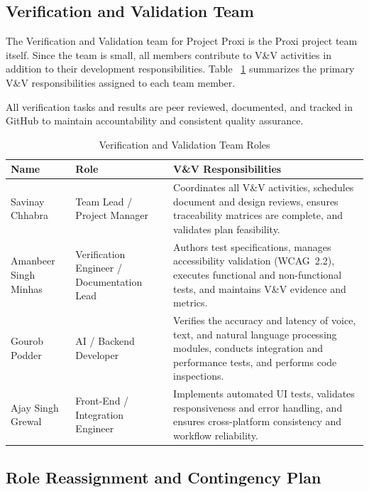 \documentclass[12pt, titlepage]{article}
\begin{document}
\subsection{Verification and Validation Team}

The Verification and Validation team for Project Proxi is the Proxi project
team itself. Since the team is small, all members contribute to V\&V
activities in addition to their development responsibilities. Table~
\ref{tab:vnv-team} summarizes the primary V\&V responsibilities assigned to
each team member.

All verification tasks and results are peer reviewed, documented, and
tracked in GitHub to maintain accountability and consistent quality
assurance.

\begin{table}[H]
\caption{Verification and Validation Team Roles}
\label{tab:vnv-team}
\centering
\begin{tabular}{|p{3cm}|p{3.5cm}|p{7.5cm}|}
\hline
\textbf{Name} & \textbf{Role} & \textbf{V\&V Responsibilities} \\
\hline
Savinay Chhabra & Team Lead / Project Manager &
Coordinates all V\&V activities, schedules document and design reviews,
ensures traceability matrices are complete, and validates plan
feasibility. \\
\hline
Amanbeer Singh Minhas & Verification Engineer / Documentation Lead &
Authors test specifications, manages accessibility validation
(WCAG~2.2), executes functional and non-functional tests, and maintains
V\&V evidence and metrics. \\
\hline
Gourob Podder & AI / Backend Developer &
Verifies the accuracy and latency of voice, text, and natural language
processing modules, conducts integration and performance tests, and
performs code inspections. \\
\hline
Ajay Singh Grewal & Front-End / Integration Engineer &
Implements automated UI tests, validates responsiveness and error
handling, and ensures cross-platform consistency and workflow
reliability. \\
\hline
\end{tabular}
\end{table}

\subsection{Role Reassignment and Contingency Plan}
\end{document}
